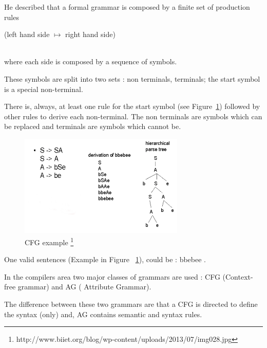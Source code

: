 \documentclass[
  oneside,
  11pt, a4paper,
  footinclude=true,
  headinclude=true,
  cleardoublepage=empty
]{scrbook}
\begin{document}
He described that a formal grammar is composed by a finite set of production rules \\
\centerline{(left hand side $\mapsto$ right hand side)} \\
where each side is composed by a sequence of symbols.

These symbols are split into two sets : non terminals, terminals; the start symbol is a special non-terminal.





There is, always, at least one rule for the start symbol (see Figure~\ref{fig:CFG}) followed by other rules to derive each non-terminal.
The non terminals are symbols which can be replaced and terminals are symbols which cannot be.

\begin{figure}[h!]
  \centering
    \includegraphics[width=0.7\textwidth]{img/GIC2.png}
    \caption{CFG example \protect\footnote{http://www.biiet.org/blog/wp-content/uploads/2013/07/img028.jpg}}
    \label{fig:CFG}
\end{figure}


One valid sentences (Example in Figure ~\ref{fig:CFG}), could be : bbebee .

In the compilers area two major classes of grammars are used : CFG (Context-free grammar) and AG ( Attribute Grammar).

The difference between these two grammars are that a CFG is directed to define the syntax (only) and, AG contains semantic and syntax rules.
\end{document}
